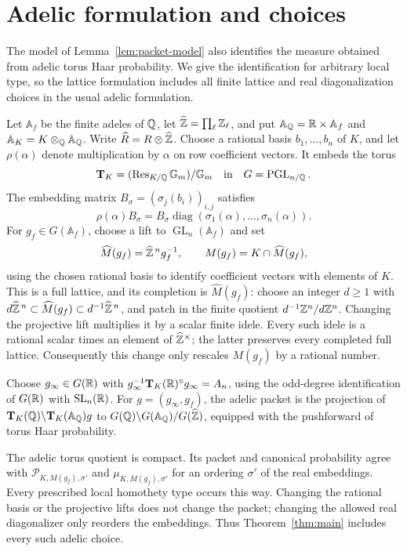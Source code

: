 \section{Adelic formulation and choices}\label{subsec:adelic-packet}

The model of Lemma~\ref{lem:packet-model} also identifies the measure obtained from adelic
torus Haar probability. We give the identification for arbitrary local
type, so the lattice formulation includes all finite lattice and real
diagonalization choices in the usual adelic formulation.

Let $\mathbb A_f$ be the finite adeles of $\mathbb Q$, let
$\widehat{\mathbb Z}=\prod_\ell\mathbb Z_\ell$, and put
$\mathbb A_\mathbb Q=\mathbb R\times\mathbb A_f$ and
$\mathbb A_K=K\otimes_\mathbb Q\mathbb A_\mathbb Q$.
Write $\widehat R=R\otimes\widehat{\mathbb Z}$.
Choose a rational basis $b_1,\ldots,b_n$ of $K$, and let
$\rho(\alpha)$ denote multiplication by $\alpha$ on row coefficient
vectors. It embeds the torus
\[
 \mathbf T_K=(\operatorname{Res}_{K/\mathbb Q}\mathbb G_m)/\mathbb G_m
 \quad\hbox{in}\quad G=\operatorname{PGL}_{n/\mathbb Q}.
\]
The embedding matrix $B_\sigma=(\sigma_j(b_i))_{i,j}$ satisfies
\begin{equation}\label{eq:regular-diagonalization}
 \rho(\alpha)B_\sigma
   =B_\sigma\operatorname{diag}(\sigma_1(\alpha),\ldots,\sigma_n(\alpha)).
\end{equation}
For $g_f\in G(\mathbb A_f)$, choose a lift to
$\operatorname{GL}_n(\mathbb A_f)$ and set
\[
 \widehat M(g_f)=\widehat{\mathbb Z}^{\,n}g_f^{-1},\qquad
 M(g_f)=K\cap\widehat M(g_f),
\]
using the chosen rational basis to identify coefficient vectors with
elements of $K$. This is a full lattice, and its completion is
$\widehat M(g_f)$: choose an integer $d\ge1$ with
$d\widehat{\mathbb Z}^{\,n}\subset\widehat M(g_f)
\subset d^{-1}\widehat{\mathbb Z}^{\,n}$, and patch in the finite quotient
$d^{-1}\mathbb Z^n/d\mathbb Z^n$. Changing the projective lift multiplies it by a
scalar finite idele. Every such idele is a rational scalar times an
element of $\widehat{\mathbb Z}^\times$; the latter preserves every completed
full lattice. Consequently this change only rescales $M(g_f)$ by
a rational number.

Choose $g_\infty\in G(\mathbb R)$ with
$g_\infty^{-1}\mathbf T_K(\mathbb R)^\circ g_\infty=A_n$, using the
odd-degree identification of $G(\mathbb R)$ with $\operatorname{SL}_n(\mathbb R)$.
For $g=(g_\infty,g_f)$, the adelic packet is the projection of
$\mathbf T_K(\mathbb Q)\backslash\mathbf T_K(\mathbb A_\mathbb Q)g$ to
$G(\mathbb Q)\backslash G(\mathbb A_\mathbb Q)/G(\widehat{\mathbb Z})$, equipped with
the pushforward of torus Haar probability.

\begin{proposition}\label{prop:adelic-packet}
The adelic torus quotient is compact. Its packet and canonical
probability agree with $\mathcal P_{K,M(g_f),\sigma'}$ and
$\mu_{K,M(g_f),\sigma'}$ for an ordering $\sigma'$ of the real
embeddings. Every prescribed local homothety type occurs this way.
Changing the rational basis or the projective lifts does not change
the packet; changing the allowed real diagonalizer only reorders the
embeddings. Thus Theorem~\ref{thm:main} includes every such adelic choice.
\end{proposition}

